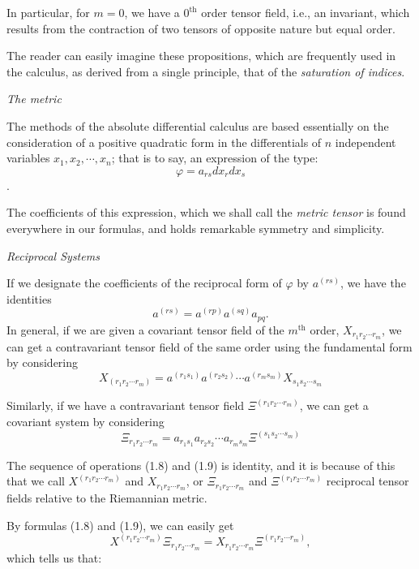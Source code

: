 \documentclass{book}
\begin{document}
In particular, for $m=0$, we have a $0^{\text{th}}$ order tensor field, i.e., an invariant, which results from the contraction of two tensors of opposite nature but equal order.

The reader can easily imagine these propositions, which are frequently used in the calculus, as derived from a single principle, that of the \emph{saturation of indices}.

\begin{center}
	\emph{The metric}
\end{center}

The methods of the absolute differential calculus are based essentially on the consideration of a positive quadratic form in the differentials of $n$ independent variables $x_1,x_2,\cdots,x_n$; that is to say, an expression of the type:
$$\varphi=a_{rs}dx_rdx_s$$.

The coefficients of this expression, which we shall call the \emph{metric tensor} is found everywhere in our formulas, and holds remarkable symmetry and simplicity.

\begin{center}
	\emph{Reciprocal Systems}
\end{center}

If we designate the coefficients of the reciprocal form of $\varphi$ by $a^{(rs)}$, we have the identities
$$a^{(rs)}=a^{(rp)}a^{(sq)}a_{pq}.$$
In general, if we are given a covariant tensor field of the $m^{\text{th}}$ order, $X_{r_1r_2\cdots r_m}$, we can get a contravariant tensor field of the same order using the fundamental form by considering
\begin{equation}
	X_{(r_1r_2\cdots r_m)}=a^{(r_1s_1)}a^{(r_2s_2)}\cdots a^{(r_ms_m)}X_{s_1s_2\cdots s_m}
\end{equation}

Similarly, if we have a contravariant tensor field $\Xi^{(r_1r_2\cdots r_m)}$, we can get a covariant system by considering
\begin{equation}
	\Xi_{r_1r_2\cdots r_m}=a_{r_1s_1}a_{r_2s_2}\cdots a_{r_ms_m}\Xi^{(s_1s_2\cdots s_m)}
\end{equation}

The sequence of operations (1.8) and (1.9) is identity, and it is because of this that we call $X^{(r_1r_2\cdots r_m)}$ and $X_{r_1r_2\cdots r_m}$, or $\Xi_{r_1r_2\cdots r_m}$ and $\Xi^{(r_1r_2\cdots r_m)}$ reciprocal tensor fields relative to the Riemannian metric. 

By formulas (1.8) and (1.9), we can easily get
\begin{equation}
X^{(r_1r_2\cdots r_m)}\Xi_{r_1r_2\cdots r_m}=X_{r_1r_2\cdots r_m}\Xi^{(r_1r_2\cdots r_m)},
\end{equation}
which tells us that:
\end{document}
